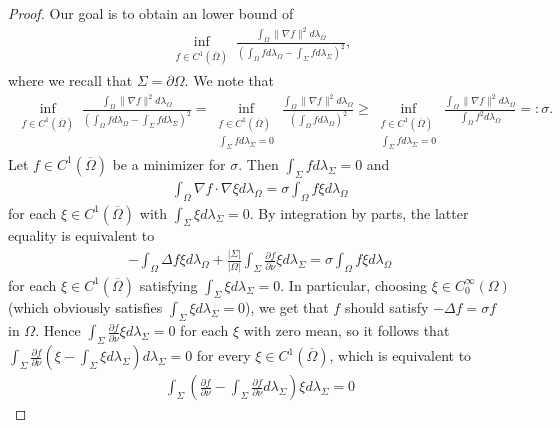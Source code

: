 \documentclass[a4paper]{article}
\theoremstyle{definition}
\numberwithin{equation}{section}
\begin{document}
\begin{proof}
Our goal is to obtain an lower bound of
\begin{align*}
\inf_{\substack {f \in C^1(\overline \Omega) }}  \frac{\int_\Omega \| \nabla f \|^2 d\lambda_\Omega}{\left( \int_\Omega f d \lambda_\Omega - \int_\Sigma f d \lambda_\Sigma \right)^2} ,
\end{align*}
where we recall that $\Sigma=\partial \Omega$. 
We note  that
\begin{align*}
\inf_{\substack {f \in C^1(\overline \Omega) }}  \frac{\int_\Omega \| \nabla f \|^2 d\lambda_\Omega}{\left( \int_\Omega f d \lambda_\Omega - \int_\Sigma f d \lambda_\Sigma \right)^2} 
=\inf_{\substack {f \in C^1(\overline \Omega)\\ \int_\Sigma f d \lambda_\Sigma=0  }}  \frac{\int_\Omega \| \nabla f \|^2 d\lambda_\Omega}{\left( \int_\Omega f d \lambda_\Omega  \right)^2} 
\geq
\inf_{\substack {f \in C^1(\overline \Omega)\\ \int_\Sigma f d \lambda_\Sigma=0  }}  \frac{\int_\Omega \| \nabla f \|^2 d\lambda_\Omega}{ \int_\Omega f^2 d \lambda_\Omega } =:\sigma. 
\end{align*}
Let $f \in C^1(\overline \Omega)$  be a minimizer for $\sigma$. Then $\int_\Sigma f d \lambda_\Sigma=0$ and 
\begin{align*}
\int_\Omega \nabla f \cdot \nabla \xi d\lambda_\Omega
=\sigma \int_\Omega f \xi d\lambda_\Omega
\end{align*}
for each $\xi \in C^1(\overline \Omega)$ with $\int_\Sigma \xi d \lambda_\Sigma=0$. By integration by parts, the latter equality is equivalent to
\begin{align*}
-\int_\Omega \Delta f   \xi d\lambda_\Omega + \frac{|\Sigma|}{|\Omega|} \int_\Sigma \frac{\partial f}{\partial \nu} \xi d\lambda_\Sigma
=\sigma \int_\Omega f \xi d\lambda_\Omega
\end{align*}
for each $\xi \in C^1(\overline \Omega)$ satisfying $\int_\Sigma \xi d \lambda_\Sigma=0$.
In particular, choosing $\xi \in C^\infty_0(\Omega)$ (which obviously satisfies $\int_\Sigma \xi d \lambda_\Sigma=0$), we get that $f$ should satisfy $-\Delta f=\sigma f$ in $\Omega$. Hence $ \int_\Sigma \frac{\partial f}{\partial \nu} \xi d\lambda_\Sigma=0$ for each $\xi$ with zero mean, so it follows that $\int_\Sigma \frac{\partial f}{\partial \nu} \left(\xi-\int_\Sigma \xi d \lambda_\Sigma\right) d\lambda_\Sigma=0$ for every $\xi \in C^1(\overline \Omega)$, which is equivalent to
\begin{align*}
\int_\Sigma \left( \frac{\partial f}{\partial \nu}-\int_\Sigma \frac{\partial f}{\partial \nu} d \lambda_\Sigma\right)\xi d\lambda_\Sigma=0

\end{align*}
\end{proof}
\end{document}
